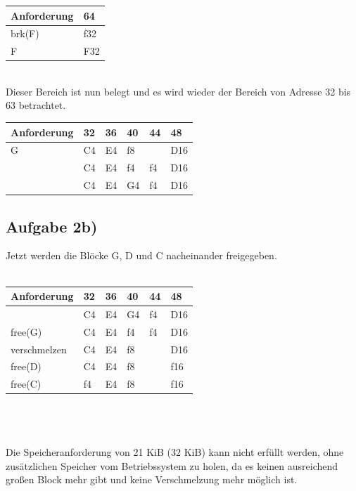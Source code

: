 \documentclass{ti2}
\begin{document}
\begin{table}[htbp]
\begin{adjustbox}{max width=\textwidth}
\begin{tabular}{|l|l|}
\hline
Anforderung & 64  \\ \hline
brk(F) & f32 \\ \hline
F & F32 \\ \hline
\end{tabular}
\end{adjustbox}
\end{table}
\\Dieser Bereich ist nun belegt und es wird wieder der Bereich von Adresse 32 bis 63 betrachtet.
\begin{table}[htbp]
\begin{adjustbox}{max width=\textwidth}
\begin{tabular}{|l|l|l|l|l|l|}
\hline
Anforderung & 32 & 36 & 40 & 44 & 48 \\ \hline
G & C4 & E4 & \multicolumn{2}{l|}{f8}  & D16 \\ \hline
 & C4 & E4 & f4 &f4 & D16 \\ \hline
 & C4 & E4 & G4 & f4 & D16 \\ \hline
\end{tabular}
\end{adjustbox}
\end{table}
\subsection*{Aufgabe 2b)}
Jetzt werden die Blöcke G, D und C nacheinander freigegeben.\\  \\
\begin{tabular}{|l|l|l|l|l|l|}
\hline
Anforderung & 32 & 36 & 40 & 44 & 48 \\ \hline
 & C4 & E4 & G4 & f4 & D16 \\ \hline
free(G) & C4 & E4 & f4 & f4 & D16 \\ \hline
verschmelzen & C4 & E4 &\multicolumn{ 2}{l|}{f8}   & D16 \\ \hline
free(D) & C4 & E4 & \multicolumn{ 2}{l|}{f8} & f16 \\ \hline
free(C) & f4 & E4 & \multicolumn{ 2}{l|}{f8} & f16 \\ \hline
\end{tabular}
\\ \\ \\Die Speicheranforderung von 21 KiB (32 KiB) kann nicht erfüllt werden, ohne zusätzlichen Speicher vom Betriebssystem zu holen, da es keinen ausreichend großen Block mehr gibt und keine Verschmelzung mehr möglich ist. 
\end{document}
